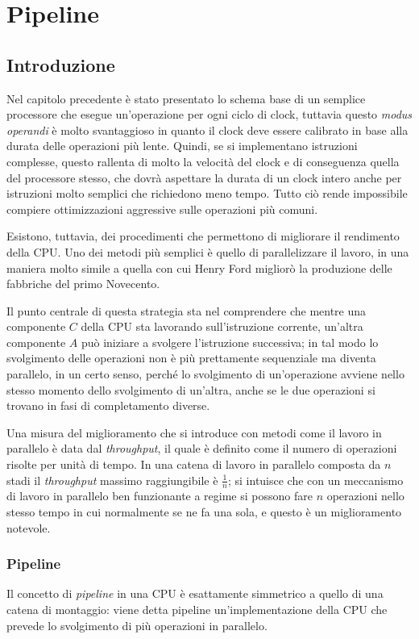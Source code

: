 \documentclass[class=book, crop=false, oneside]{standalone}
\begin{document}
\chapter{Pipeline}

\section{Introduzione}
Nel capitolo precedente è stato presentato lo schema base di un semplice processore che esegue un'operazione per ogni ciclo di clock, tuttavia questo \emph{modus operandi} è molto svantaggioso in quanto il clock deve essere calibrato in base alla durata delle operazioni più lente. Quindi, se si implementano istruzioni complesse, questo rallenta di molto la velocità del clock e di conseguenza quella del processore stesso, che dovrà aspettare la durata di un clock intero anche per istruzioni molto semplici che richiedono meno tempo. Tutto ciò rende impossibile compiere ottimizzazioni aggressive sulle operazioni più comuni.

Esistono, tuttavia, dei procedimenti che permettono di migliorare il rendimento della CPU.
Uno dei metodi più semplici è quello di parallelizzare il lavoro, in una maniera molto simile a quella con cui Henry Ford migliorò la produzione delle fabbriche del primo Novecento.

Il punto centrale di questa strategia sta nel comprendere che mentre una componente \(C\) della CPU sta lavorando sull'istruzione corrente, un'altra componente \(A\) può iniziare a svolgere l'istruzione successiva; in tal modo lo svolgimento delle operazioni non è più prettamente sequenziale ma diventa parallelo, in un certo senso, perché lo svolgimento di un'operazione avviene nello stesso momento dello svolgimento di un'altra, anche se le due operazioni si trovano in fasi di completamento diverse.

Una misura del miglioramento che si introduce con metodi come il lavoro in parallelo è data dal \emph{throughput}, il quale è definito come il numero di operazioni risolte per unità di tempo. In una catena di lavoro in parallelo composta da \(n\) stadi il \emph{throughput} massimo raggiungibile è \(\frac{1}{n}\); si intuisce che con un meccanismo di lavoro in parallelo ben funzionante a regime si possono fare \(n\) operazioni nello stesso tempo in cui normalmente se ne fa una sola, e questo è un miglioramento notevole.

\subsection*{Pipeline}
Il concetto di \emph{pipeline} in una CPU è esattamente simmetrico a quello di una catena di montaggio: viene detta pipeline un'implementazione della CPU che prevede lo svolgimento di più operazioni in parallelo.
\end{document}
